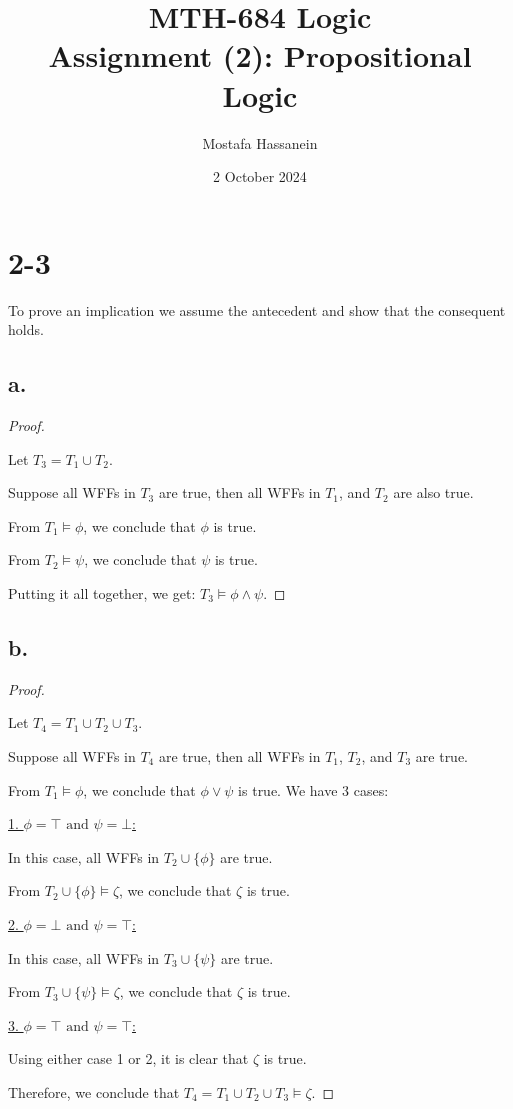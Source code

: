 \documentclass{article}
\author{Mostafa Hassanein}
\title{
  MTH-684 Logic \\
  Assignment (2): Propositional Logic}
\date{2 October 2024}
\begin{document}
\maketitle
\newpage

\section*{2-3}

To prove an implication we assume the antecedent and show that the consequent holds.

\subsection*{a.}
\begin{proof}
  $ $

  Let $T_3 = T_1 \cup T_2$.

  Suppose all WFFs in $T_3$ are true, then all WFFs in $T_1$, and $T_2$ are also true.

  From $T_1 \models \phi$, we conclude that $\phi$ is true.

  From $T_2 \models \psi$, we conclude that $\psi$ is true.

  Putting it all together, we get: $T_3 \models \phi \land \psi$.

\end{proof}

\subsection*{b.}
\begin{proof}
  $ $

  Let $T_4 = T_1 \cup T_2 \cup T_3$.

  Suppose all WFFs in $T_4$ are true, then all WFFs in $T_1$, $T_2$, and $T_3$ are true.
  
  From $T_1 \models \phi$, we conclude that $\phi \lor \psi$ is true. We have 3 cases:
  \newline

  \underline{1. $\phi = \top \text{ and } \psi = \bot$:}
  
  In this case, all WFFs in $T_2 \cup \{ \phi \}$ are true.
  
  From $T_2 \cup \{ \phi \} \models \zeta$, we conclude that $\zeta$ is true.
  \newline

  \underline{2. $\phi = \bot \text{ and } \psi = \top$:}
  
  In this case, all WFFs in $T_3 \cup \{ \psi \}$ are true.
  
  From $T_3 \cup \{ \psi \} \models \zeta$, we conclude that $\zeta$ is true.
  \newline

  \underline{3. $\phi = \top \text{ and } \psi = \top$:}
  
  Using either case 1 or 2, it is clear that $\zeta$ is true.
  \newline

  Therefore, we conclude that $T_4 = T_1 \cup T_2 \cup T_3 \models \zeta$.  

\end{proof}
\end{document}
